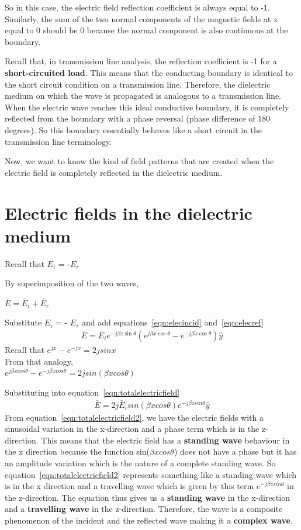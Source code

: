 So in this case, the electric field reflection coefficient is always equal to -1. Similarly, the sum of the two normal components of the
magnetic fields at x equal to 0 should be 0 because the normal component is also continuous at the boundary.

Recall that, in transmission line analysis, the reflection coefficient is -1 for a \textbf{short-circuited load}. This means that the conducting boundary is identical to the short circuit condition on a transmission line. Therefore, the dielectric medium on which the wave is propagated is analogous to a transmission line. When the electric wave reaches this ideal conductive boundary, it is completely reflected from the boundary with a phase reversal (phase difference of 180 degrees). So this boundary essentially behaves like a short circuit in the transmission line terminology.

Now, we want to know the kind of field patterns that are created when the electric field is completely reflected in the dielectric medium.

\section{Electric fields in the dielectric medium}
Recall that $E_{i}$ = -$E_{r}$

By superimposition of the two waves,

$\bar{E}= \bar{E}_i + \bar{E}_r$

Substitute $E_i$ = - $E_r$ and add equations~\eqref{eqn:elecincid} and~\eqref{eqn:elecref}
\begin{align}
\bar{E}= \bar{E}_i e^{-j\beta z\sin\theta} (e^{j\beta x\cos\theta }- e^{-j\beta x\cos\theta}) \hat{y}
\label{eqn:totalelectricfield}
\end{align}
Recall that $e^{jx} - e^{-jx} = 2jsinx$\\ 
From that analogy,\\ 
$e^{j\beta xcos\theta} - e^{-j\beta xcos\theta} = 2jsin(\beta xcos\theta)$

Substituting into equation~\ref{eqn:totalelectricfield}
\begin{align}
\bar{E}=2j \bar{E}_i sin(\beta xcos\theta) e^{-j\beta zsin\theta} \hat{y}
\label{eqn:totalelectricfield2}
\end{align}
From equation~\ref{eqn:totalelectricfield2}, we have the electric fields with a sinusoidal variation in the x-direction and a phase term which is in the z-direction. This means that the electric field has a \textbf{standing wave} behaviour in the x direction because the function {sin({$\beta xcos\theta$})} does not have a phase but it has an amplitude variation which is the nature of a complete standing wave. So equation~\ref{eqn:totalelectricfield2} represents something like a standing wave which is in the x direction and a travelling wave which is given by this term \textbf{$e^{-j\beta zsin\theta}$} in the z-direction. The equation thus gives us a \textbf{standing wave} in the x-direction and a \textbf{travelling wave} in the z-direction. Therefore, the wave is a composite phenomenon of the incident and the reflected wave making it a \textbf{complex wave}.

